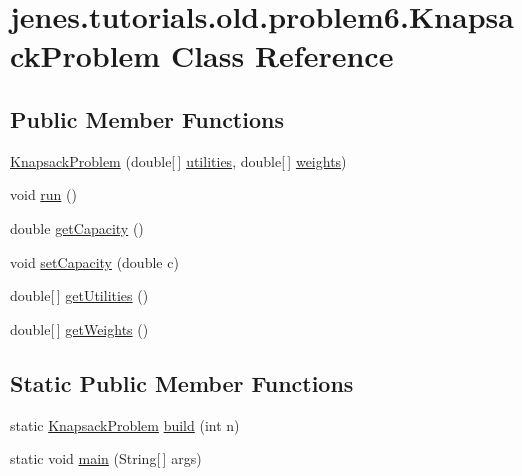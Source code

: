 \hypertarget{classjenes_1_1tutorials_1_1old_1_1problem6_1_1_knapsack_problem}{\section{jenes.\-tutorials.\-old.\-problem6.\-Knapsack\-Problem Class Reference}
\label{classjenes_1_1tutorials_1_1old_1_1problem6_1_1_knapsack_problem}
}
\subsection*{Public Member Functions}
\begin{DoxyCompactItemize}
\item 
\hyperlink{classjenes_1_1tutorials_1_1old_1_1problem6_1_1_knapsack_problem_a98ced3e27ae818b37a2a3eb0049d6e85}{Knapsack\-Problem} (double\mbox{[}$\,$\mbox{]} \hyperlink{classjenes_1_1tutorials_1_1old_1_1problem6_1_1_knapsack_problem_abc9ec3d0ee0897d7c8a0ed97f3ae82c8}{utilities}, double\mbox{[}$\,$\mbox{]} \hyperlink{classjenes_1_1tutorials_1_1old_1_1problem6_1_1_knapsack_problem_afdefd7f28bc8f4569e2119d9d7e6d9a7}{weights})
\item 
void \hyperlink{classjenes_1_1tutorials_1_1old_1_1problem6_1_1_knapsack_problem_adbb69b885007d3726fc810356eac67c0}{run} ()
\item 
double \hyperlink{classjenes_1_1tutorials_1_1old_1_1problem6_1_1_knapsack_problem_abd6659702b32915c9b2a5a6666f1dc48}{get\-Capacity} ()
\item 
void \hyperlink{classjenes_1_1tutorials_1_1old_1_1problem6_1_1_knapsack_problem_aecba52f753029fdda23b07cf2242f924}{set\-Capacity} (double c)
\item 
double\mbox{[}$\,$\mbox{]} \hyperlink{classjenes_1_1tutorials_1_1old_1_1problem6_1_1_knapsack_problem_a128edb3ce375d4f9198e4c8373efb183}{get\-Utilities} ()
\item 
double\mbox{[}$\,$\mbox{]} \hyperlink{classjenes_1_1tutorials_1_1old_1_1problem6_1_1_knapsack_problem_ab14674173825d76b3fb45b0a7e4f664e}{get\-Weights} ()
\end{DoxyCompactItemize}
\subsection*{Static Public Member Functions}
\begin{DoxyCompactItemize}
\item 
static \hyperlink{classjenes_1_1tutorials_1_1old_1_1problem6_1_1_knapsack_problem}{Knapsack\-Problem} \hyperlink{classjenes_1_1tutorials_1_1old_1_1problem6_1_1_knapsack_problem_a8e9ae71984885743ff2892d4bff2727e}{build} (int n)
\item 
static void \hyperlink{classjenes_1_1tutorials_1_1old_1_1problem6_1_1_knapsack_problem_a135fb0906a4034fcd7be21c23f794953}{main} (String\mbox{[}$\,$\mbox{]} args)
\end{DoxyCompactItemize}
